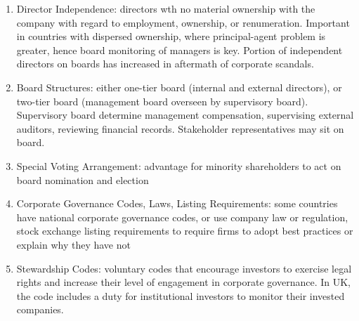 \begin{remark} 
\begin{enumerate}[label=\roman*.]
\setlength{\itemsep}{0pt}
\item Director Independence: directors wth no material ownership with the company with regard to employment, ownership, or renumeration. Important in countries with dispersed ownership, where principal-agent problem is greater, hence board monitoring of managers is key. Portion of independent directors on boards has increased in aftermath of corporate scandals.
\item Board Structures: either one-tier board (internal and external directors), or two-tier board (management board overseen by supervisory board). Supervisory board determine management compensation, supervising external auditors, reviewing financial records. Stakeholder representatives may sit on board.
\item Special Voting Arrangement: advantage for minority shareholders to act on board nomination and election
\item Corporate Governance Codes, Laws, Listing Requirements: some countries have national corporate governance codes, or use company law or regulation, stock exchange listing requirements to require firms to adopt best practices or explain why they have not
\item Stewardship Codes: voluntary codes that encourage investors to exercise legal rights and increase their level of engagement in corporate governance. In UK, the code includes a duty for institutional investors to monitor their invested companies.
\end{enumerate}
\end{remark}

